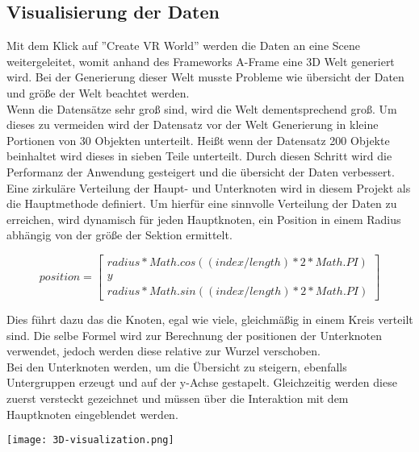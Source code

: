 \subsection{Visualisierung der Daten}
Mit dem Klick auf ''Create VR World'' werden die Daten an eine Scene weitergeleitet, womit anhand des Frameworks A-Frame eine 3D Welt
generiert wird. Bei der Generierung dieser Welt musste Probleme wie übersicht der Daten und größe der Welt beachtet werden. \\
Wenn die Datensätze sehr groß sind, wird die Welt dementsprechend groß. Um dieses zu vermeiden wird der Datensatz vor der Welt Generierung
in kleine Portionen von 30 Objekten unterteilt. Heißt wenn der Datensatz 200 Objekte beinhaltet wird dieses in sieben Teile unterteilt.
Durch diesen Schritt wird die Performanz der Anwendung gesteigert und die übersicht der Daten verbessert. \\
Eine zirkuläre Verteilung der Haupt- und Unterknoten wird in diesem Projekt als die Hauptmethode definiert.  Um hierfür eine sinnvolle
Verteilung der Daten zu erreichen, wird dynamisch für jeden Hauptknoten, ein Position in einem Radius abhängig von der größe der Sektion
ermittelt.
\begin{center}
    \begin{equation*}
        position=
        \begin{bmatrix}
            radius * Math.cos((index / length) * 2 * Math.PI) \\
            y \\
            radius * Math.sin((index / length) * 2 * Math.PI)
        \end{bmatrix}
    \end{equation*}
\end{center}
Dies führt dazu das die Knoten, egal wie viele, gleichmäßig in einem Kreis verteilt sind. Die selbe Formel wird zur Berechnung der
positionen der Unterknoten verwendet, jedoch werden diese relative zur Wurzel verschoben. \\
Bei den Unterknoten werden, um die Übersicht zu steigern, ebenfalls Untergruppen erzeugt und auf der y-Achse gestapelt. Gleichzeitig werden
diese zuerst versteckt gezeichnet und müssen über die Interaktion mit dem Hauptknoten eingeblendet werden.
\begin{center}
    \texttt{[image: 3D-visualization.png]}
\end{center}

\newpage
